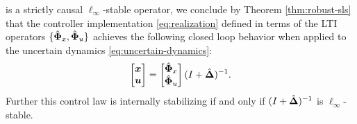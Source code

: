 is a strictly causal $\ell_\infty$-stable operator, we conclude by Theorem \ref{thm:robust-sls} that the controller implementation \eqref{eq:realization} defined in terms of the LTI operators $\{\hat{\boldsymbol{\Phi}}_x,\hat{\boldsymbol{\Phi}}_u\}$ achieves the following closed loop behavior when applied to the uncertain dynamics \eqref{eq:uncertain-dynamics}:
\begin{equation}
\begin{bmatrix}\boldsymbol{x} \\ \boldsymbol{u} \end{bmatrix} = \begin{bmatrix} \hat{\boldsymbol{\Phi}}_x \\ \hat{\boldsymbol{\Phi}}_u \end{bmatrix}(I+\hat{\boldsymbol{\Delta}})^{-1}.
\label{eq:dhat-response}
\end{equation}
Further this control law is internally stabilizing if and only if $(I+\hat{\boldsymbol{\Delta}})^{-1}$ is $\ell_\infty$-stable.  

